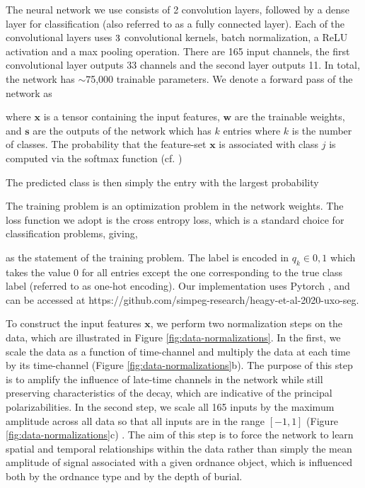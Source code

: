 \documentclass{segabs}
\begin{document}
The neural network we use consists of 2 convolution layers, followed by a dense layer for classification (also referred to as a fully connected layer). Each of the convolutional layers uses $3\time3$ convolutional kernels, batch normalization, a ReLU activation and a max pooling operation. There are 165 input channels, the first convolutional layer outputs 33 channels and the second layer outputs 11. In total, the network has $\sim$75,000 trainable parameters. We denote a forward pass of the network as

where $\mathbf{x}$ is a tensor containing the input features, $\mathbf{w}$ are the trainable weights, and $\mathbf{s}$ are the outputs of the network which has $k$ entries where $k$ is the number of classes. The probability that the feature-set $\mathbf{x}$ is associated with class $j$ is computed via the softmax function (cf. \cite{Hastie2009})

The predicted class is then simply the entry with the largest probability

The training problem is an optimization problem in the network weights. The loss function we adopt is the cross entropy loss, which is a standard choice for classification problems, giving,

as the statement of the training problem. The label is encoded in $q_k \in {0, 1}$ which takes the value 0 for all entries except the one corresponding to the true class label (referred to as one-hot encoding). Our implementation uses Pytorch \citep{Paszke2019}, and can be accessed at https://github.com/simpeg-research/heagy-et-al-2020-uxo-seg.

To construct the input features $\mathbf{x}$, we perform two normalization steps on the data, which are illustrated in Figure \ref{fig:data-normalizations}. In the first, we scale the data as a function of time-channel and multiply the data at each time by its time-channel (Figure \ref{fig:data-normalizations}b). The purpose of this step is to amplify the influence of late-time channels in the network while still preserving characteristics of the decay, which are indicative of the principal polarizabilities. In the second step, we scale all 165 inputs by the maximum amplitude across all data so that all inputs are in the range $[-1, 1]$ (Figure \ref{fig:data-normalizations}c) . The aim of this step is to force the network to learn spatial and temporal relationships within the data rather than simply the mean amplitude of signal associated with a given ordnance object, which is influenced both by the ordnance type and by the depth of burial.

\end{document}
